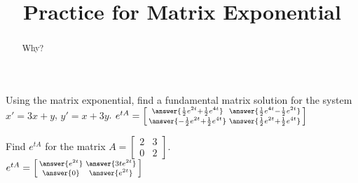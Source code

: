 \documentclass{ximera}
\title{Practice for Matrix Exponential}
\begin{document}
\begin{abstract}
Why?
\end{abstract}
\maketitle

\begin{exercise}
    Using the matrix exponential, find a fundamental matrix solution for the system $x' = 3x+y$, $y' = x+3y$.
    $e^{tA} = \left[\begin{smallmatrix} \answer{\frac{1}{2}e^{2t} + \frac{1}{2}e^{4t}} & \answer{\frac{1}{2}e^{4t} - \frac{1}{2}e^{2t}} \\ \answer{-\frac{1}{2}e^{2t} + \frac{1}{2}e^{4t}} & \answer{\frac{1}{2}e^{2t} + \frac{1}{2}e^{4t}} \end{smallmatrix}\right]$
\end{exercise}

\begin{exercise}
    Find $e^{tA}$ for the matrix $A =
    \left[ \begin{smallmatrix}
        2 & 3 \\
        0 & 2
    \end{smallmatrix} \right]$.\\
    $e^{tA} = \left[\begin{smallmatrix}  \answer{e^{2t}} & \answer{3te^{2t}} \\ \answer{0} & \answer{e^{2t}} \end{smallmatrix}\right]$
\end{exercise}
\end{document}
